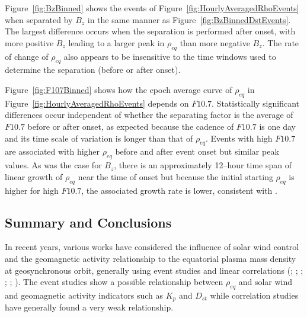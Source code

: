 \documentclass[draft,linenumbers]{agujournal}
\begin{document}
Figure~\ref{fig:BzBinned} shows the events of Figure~\ref{fig:HourlyAveragedRhoEvents} when separated by $B_z$ in the same manner as Figure~\ref{fig:BzBinnedDstEvents}.  The largest difference occurs when the separation is performed after onset, with more positive $B_z$ leading to a larger peak in $\rho_{eq}$ than more negative $B_{z}$.  The rate of change of $\rho_{eq}$ also appears to be insensitive to the time windows used to determine the separation (before or after onset).  


Figure~\ref{fig:F107Binned} shows how the epoch average curve of $\rho_{eq}$ in Figure~\ref{fig:HourlyAveragedRhoEvents} depends on $F10.7$.  Statistically significant differences occur independent of whether the separating factor is the average of $F10.7$ before or after onset, as expected because the cadence of $F10.7$ is one day and its time scale of variation is longer than that of $\rho_{eq}$.  Events with high $F10.7$ are associated with higher $\rho_{eq}$ before and after event onset but similar peak values.  As was the case for $B_z$, there is an approximately 12--hour time span of linear growth of $\rho_{eq}$ near the time of onset but because the initial starting $\rho_{eq}$ is higher for high $F10.7$, the associated growth rate is lower, consistent with \citet{Denton2016}.

\subsection{Summary and Conclusions}

In recent years, various works have considered the influence of solar wind control and the geomagnetic activity relationship to the equatorial plasma mass density at geosynchronous orbit, generally using event studies and linear correlations (\citet{Takahashi2006}; \citet{Denton2006}; \citet{Yao2008}; \citet{Takahashi2010}; \citet{Denton2011}; \citet{Denton2016}).  The event studies show a possible relationship between $\rho_{eq}$ and solar wind and geomagnetic activity indicators such as $K_p$ and $D_{st}$ while correlation studies have generally found a very weak relationship.
\end{document}
